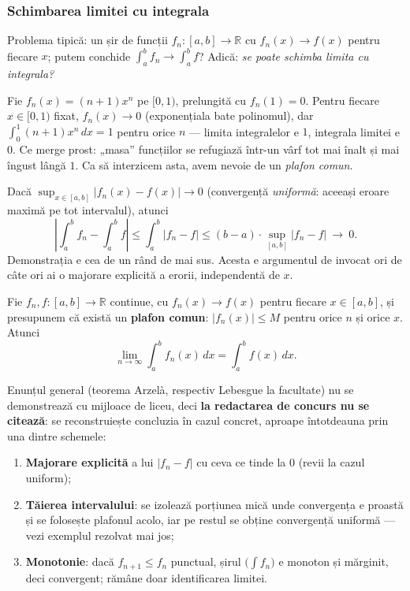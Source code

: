 \subsubsection{Schimbarea limitei cu integrala}

Problema tipică: un șir de funcții $f_n:[a,b]\to\mathbb{R}$ cu $f_n(x)\to f(x)$ pentru fiecare $x$; putem conchide $\int_a^b f_n\to\int_a^b f$? Adică: \emph{se poate schimba limita cu integrala?}

\begin{obs}
Fie $f_n(x)=(n+1)x^n$ pe $[0,1)$, prelungită cu $f_n(1)=0$. Pentru fiecare $x\in[0,1)$ fixat, $f_n(x)\to0$ (exponențiala bate polinomul), dar
$\int_0^1(n+1)x^n\,dx=1$ pentru orice $n$ --- limita integralelor e $1$, integrala limitei e $0$. Ce merge prost: „masa'' funcțiilor se refugiază într-un vârf tot mai înalt și mai îngust lângă $1$. Ca să interzicem asta, avem nevoie de un \emph{plafon comun}.
\end{obs}

\begin{teorema}
Dacă $\displaystyle\sup_{x\in[a,b]}|f_n(x)-f(x)|\to0$ (convergență \emph{uniformă}: aceeași eroare maximă pe tot intervalul), atunci
\[
\left|\int_a^b f_n-\int_a^b f\right|\le\int_a^b|f_n-f|\le(b-a)\cdot\sup_{[a,b]}|f_n-f|\ \to\ 0.
\]
Demonstrația e cea de un rând de mai sus. Acesta e argumentul de invocat ori de câte ori ai o majorare explicită a erorii, independentă de $x$.
\end{teorema}

\begin{teorema}
Fie $f_n,f:[a,b]\to\mathbb{R}$ continue, cu $f_n(x)\to f(x)$ pentru fiecare $x\in[a,b]$, și presupunem că există un \textbf{plafon comun}: $|f_n(x)|\le M$ pentru orice $n$ și orice $x$. Atunci
\[
\lim_{n\to\infty}\int_a^b f_n(x)\,dx=\int_a^b f(x)\,dx.
\]
\end{teorema}

\begin{obs}
Enunțul general (teorema Arzelà, respectiv Lebesgue la facultate) nu se demonstrează cu mijloace de liceu, deci \textbf{la redactarea de concurs nu se citează}: se reconstruiește concluzia în cazul concret, aproape întotdeauna prin una dintre schemele:
\begin{enumerate}[leftmargin=*, itemsep=1pt]
\item \textbf{Majorare explicită} a lui $|f_n-f|$ cu ceva ce tinde la $0$ (revii la cazul uniform);
\item \textbf{Tăierea intervalului}: se izolează porțiunea mică unde convergența e proastă și se folosește plafonul acolo, iar pe restul se obține convergență uniformă --- vezi exemplul rezolvat mai jos;
\item \textbf{Monotonie}: dacă $f_{n+1}\le f_n$ punctual, șirul $\big(\int f_n\big)$ e monoton și mărginit, deci convergent; rămâne doar identificarea limitei.
\end{enumerate}
\end{obs}

